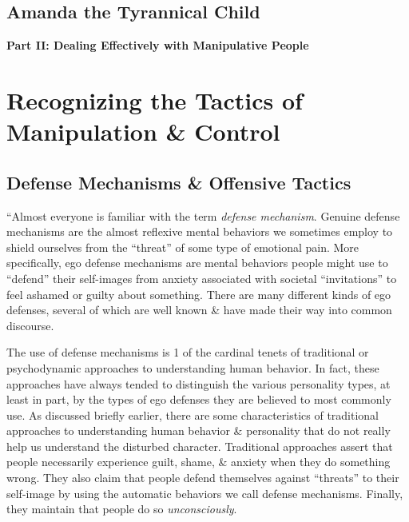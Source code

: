 \documentclass{article}
\numberwithin{equation}{section}
\begin{document}
\subsection{Amanda the Tyrannical Child}


\begin{center}\LARGE\sf
	\textbf{Part II: Dealing Effectively with Manipulative People}
\end{center}

\section{Recognizing the Tactics of Manipulation \& Control}

\subsection{Defense Mechanisms \& Offensive Tactics}
``Almost everyone is familiar with the term \textit{defense mechanism}. Genuine defense mechanisms are the almost reflexive mental behaviors we sometimes employ to shield ourselves from the ``threat'' of some type of emotional pain. More specifically, ego defense mechanisms are mental behaviors people might use to ``defend'' their self-images from anxiety associated with societal ``invitations'' to feel ashamed or guilty about something. There are many different kinds of ego defenses, several of which are well known \& have made their way into common discourse.

The use of defense mechanisms is 1 of the cardinal tenets of traditional or psychodynamic approaches to understanding human behavior. In fact, these approaches have always tended to distinguish the various personality types, at least in part, by the types of ego defenses they are believed to most commonly use. As discussed briefly earlier, there are some characteristics of traditional approaches to understanding human behavior \& personality that do not really help us understand the disturbed character. Traditional approaches assert that people necessarily experience guilt, shame, \& anxiety when they do something wrong. They also claim that people defend themselves against ``threats'' to their self-image by using the automatic behaviors we call defense mechanisms. Finally, they maintain that people do so \textit{unconsciously}.
\end{document}

